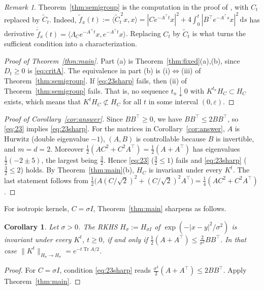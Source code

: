 \documentclass[11pt]{amsart}
\numberwithin{equation}{section}
\newtheorem{corollary}[theorem]{Corollary}
\theoremstyle{definition}
\theoremstyle{remark}
\newtheorem{remark}[theorem]{Remark}
\newcommand{\Tr}{\operatorname{Tr}}
\newcommand{\dd}{\,\mathrm{d}}
\newcommand{\Ct}{\widetilde{C}_t}
\newcommand{\ip}[2]{\langle #1,#2\rangle}
\newcommand{\tp}{\top}
\begin{document}
\begin{remark}
Theorem~\ref{thm:semigroup} is the computation in the proof of \cite[Theorem~2.1]{PSWPN}, with $C_t$ replaced by $\Ct$.
Indeed, $\widetilde f_x(t):=\ip{\Ct^{\,2}x}x=|Ce^{-A^\tp t}x|^2+4\int_0^t|B^\tp e^{-A^\tp s}x|^2\dd s$ has derivative
$\dot{\widetilde f}_x(t)=\ip{\Lambda_Ce^{-A^\tp t}x}{e^{-A^\tp t}x}$. Replacing $C_t$ by $\Ct$ is what turns the
sufficient condition into a characterization.
\end{remark}

\begin{proof}[Proof of Theorem~\ref{thm:main}]
Part (a) is Theorem~\ref{thm:fixed}(a),(b), since $D_t\ge0$ is \eqref{eq:critA}. The equivalence in part (b) is
(i)$\Leftrightarrow$(iii) of Theorem~\ref{thm:semigroup}. If \eqref{eq:23sharp} fails, then (ii) of
Theorem~\ref{thm:semigroup} fails. That is, no sequence $t_n\downarrow0$ with $K^{t_n}H_C\subset H_C$ exists, which means that
$K^tH_C\not\subset H_C$ for all $t$ in some interval $(0,\varepsilon)$.
\end{proof}

\begin{proof}[Proof of Corollary~\ref{cor:answer}]
Since $BB^\tp\ge0$, we have $BB^\tp\le2BB^\tp$, so \eqref{eq:23} implies \eqref{eq:23sharp}. For the matrices in
Corollary~\ref{cor:answer}, $A$ is Hurwitz (double eigenvalue $-1$), $(A,B)$ is controllable because $B$ is
invertible, and $m=d=2$. Moreover $\frac12(AC^2+C^2A^\tp)=\frac12(A+A^\tp)$ has eigenvalues $\frac12(-2\pm5)$, the
largest being $\frac32$. Hence \eqref{eq:23} ($\frac32\le1$) fails and \eqref{eq:23sharp} ($\frac32\le2$) holds. By
Theorem~\ref{thm:main}(b), $H_C$ is invariant under every $K^t$. The last statement follows from
$\frac12\bigl(A(C/\sqrt2)^2+(C/\sqrt2)^2A^\tp\bigr)=\frac14(AC^2+C^2A^\tp)$.
\end{proof}

For isotropic kernels, $C=\sigma I$, Theorem~\ref{thm:main} sharpens \cite[Corollary~2.3]{PSWPN} as follows.

\begin{corollary}\label{cor:iso}
Let $\sigma>0$. The RKHS $H_\sigma:=H_{\sigma I}$ of $\exp(-|x-y|^2/\sigma^2)$ is invariant under every $K^t$,
$t\ge0$, if and only if $\frac12(A+A^\tp)\le\frac{2}{\sigma^2}BB^\tp$. In that case
$\|K^t\|_{H_\sigma\to H_\sigma}=e^{-t\Tr A/2}$.
\end{corollary}

\begin{proof}
For $C=\sigma I$, condition \eqref{eq:23sharp} reads $\frac{\sigma^2}2(A+A^\tp)\le2BB^\tp$. Apply
Theorem~\ref{thm:main}.
\end{proof}
\end{document}
